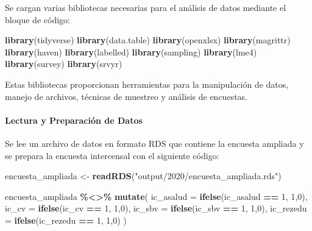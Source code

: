 \documentclass[
  12pt,
]{book}
\newenvironment{Shaded}{\begin{snugshade}}{\end{snugshade}}
\newcommand{\AttributeTok}[1]{\textcolor[rgb]{0.13,0.29,0.53}{#1}}
\newcommand{\DecValTok}[1]{\textcolor[rgb]{0.00,0.00,0.81}{#1}}
\newcommand{\FunctionTok}[1]{\textcolor[rgb]{0.13,0.29,0.53}{\textbf{#1}}}
\newcommand{\NormalTok}[1]{#1}
\newcommand{\OtherTok}[1]{\textcolor[rgb]{0.56,0.35,0.01}{#1}}
\newcommand{\SpecialCharTok}[1]{\textcolor[rgb]{0.81,0.36,0.00}{\textbf{#1}}}
\newcommand{\StringTok}[1]{\textcolor[rgb]{0.31,0.60,0.02}{#1}}
\begin{document}
Se cargan varias bibliotecas necesarias para el análisis de datos mediante el bloque de código:

\begin{Shaded}
\begin{Highlighting}[]
\FunctionTok{library}\NormalTok{(tidyverse)}
\FunctionTok{library}\NormalTok{(data.table)}
\FunctionTok{library}\NormalTok{(openxlsx)}
\FunctionTok{library}\NormalTok{(magrittr)}
\FunctionTok{library}\NormalTok{(haven)}
\FunctionTok{library}\NormalTok{(labelled)}
\FunctionTok{library}\NormalTok{(sampling)}
\FunctionTok{library}\NormalTok{(lme4)}
\FunctionTok{library}\NormalTok{(survey)}
\FunctionTok{library}\NormalTok{(srvyr)}
\end{Highlighting}
\end{Shaded}

Estas bibliotecas proporcionan herramientas para la manipulación de datos, manejo de archivos, técnicas de muestreo y análisis de encuestas.

\hypertarget{lectura-y-preparaciuxf3n-de-datos-1}{%
\paragraph*{Lectura y Preparación de Datos}\label{lectura-y-preparaciuxf3n-de-datos-1}}

Se lee un archivo de datos en formato RDS que contiene la encuesta ampliada y se prepara la encuesta intercensal con el siguiente código:

\begin{Shaded}
\begin{Highlighting}[]
\NormalTok{encuesta\_ampliada }\OtherTok{\textless{}{-}} \FunctionTok{readRDS}\NormalTok{(}\StringTok{"output/2020/encuesta\_ampliada.rds"}\NormalTok{)}

\NormalTok{encuesta\_ampliada }\SpecialCharTok{\%\textless{}\textgreater{}\%} \FunctionTok{mutate}\NormalTok{(}
  \AttributeTok{ic\_asalud =} \FunctionTok{ifelse}\NormalTok{(ic\_asalud }\SpecialCharTok{==} \DecValTok{1}\NormalTok{, }\DecValTok{1}\NormalTok{,}\DecValTok{0}\NormalTok{),}
  \AttributeTok{ic\_cv =} \FunctionTok{ifelse}\NormalTok{(ic\_cv }\SpecialCharTok{==} \DecValTok{1}\NormalTok{, }\DecValTok{1}\NormalTok{,}\DecValTok{0}\NormalTok{),}
  \AttributeTok{ic\_sbv =} \FunctionTok{ifelse}\NormalTok{(ic\_sbv }\SpecialCharTok{==} \DecValTok{1}\NormalTok{, }\DecValTok{1}\NormalTok{,}\DecValTok{0}\NormalTok{),}
  \AttributeTok{ic\_rezedu =} \FunctionTok{ifelse}\NormalTok{(ic\_rezedu }\SpecialCharTok{==} \DecValTok{1}\NormalTok{, }\DecValTok{1}\NormalTok{,}\DecValTok{0}\NormalTok{)}
\NormalTok{) }
\end{Highlighting}
\end{Shaded}
\end{document}
